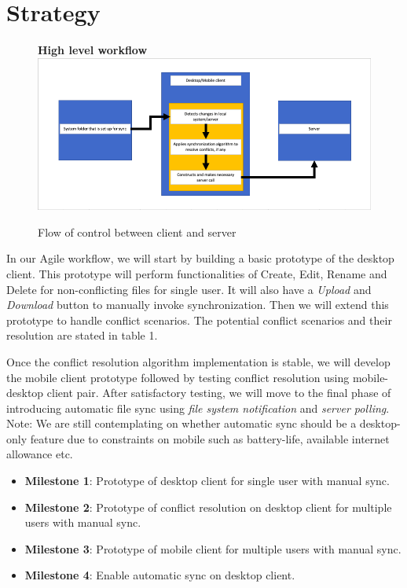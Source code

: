 \section{Strategy}
\begin{figure}[H]
	\centering
	\textbf{High level workflow}
	\includegraphics[width=\linewidth]{images/1.png}
	\caption{Flow of control between client and server}
\end{figure}\par
In our Agile workflow, we will start by building a basic prototype of the desktop client. This prototype will perform functionalities of Create, Edit, Rename and Delete for non-conflicting files for single user. It will also have a \emph{Upload} and \emph{Download} button to manually invoke synchronization. Then we will extend this prototype to handle conflict scenarios. The potential conflict scenarios and their resolution are stated in table 1.\newline

Once the conflict resolution algorithm implementation is stable, we will develop the mobile client prototype followed by testing conflict resolution using mobile-desktop client pair. After satisfactory testing, we will move to the final phase of introducing automatic file sync using \emph{file system notification} and \emph{server polling}. Note: We are still contemplating on whether automatic sync should be a desktop-only feature due to constraints on mobile such as battery-life, available internet allowance etc.

\begin{itemize}
\item \textbf{Milestone 1}: Prototype of desktop client for single user with manual sync.
\item \textbf{Milestone 2}: Prototype of conflict resolution on desktop client for multiple users with manual sync.
\item \textbf{Milestone 3}: Prototype of mobile client for multiple users with manual sync.
\item \textbf{Milestone 4}: Enable automatic sync on desktop client.
\end{itemize}
